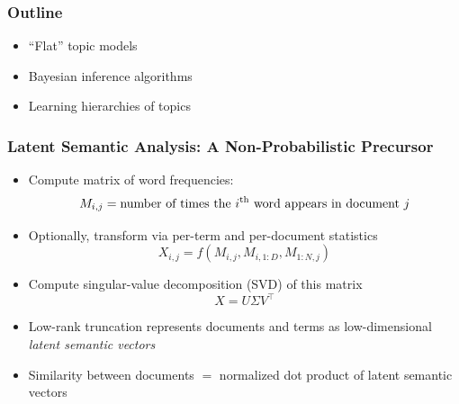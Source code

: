 \begin{frame}
\frametitle{Outline}
\begin{itemize}[<+->]
\item ``Flat'' topic models
\item Bayesian inference algorithms
\item Learning hierarchies of topics
\end{itemize}
\end{frame}



\begin{frame}
\frametitle{Latent Semantic Analysis: A Non-Probabilistic Precursor}
\begin{itemize}[<+->]
\item Compute matrix of word frequencies:
\[ M_{i,j} = \text{number of times the $i^{\text{th}}$ word appears in document $j$} \]
\item Optionally, transform via per-term and per-document statistics
\[ X_{i,j} = f(M_{i,j}, M_{i,1:D}, M_{1:N,j}) \]
\item Compute singular-value decomposition (SVD) of this matrix
\[ X = U \Sigma V^\top \]
\item Low-rank truncation represents documents and terms as low-dimensional \emph{latent semantic vectors}
\item Similarity between documents $=$ normalized dot product of latent semantic vectors
\end{itemize}
\end{frame}

